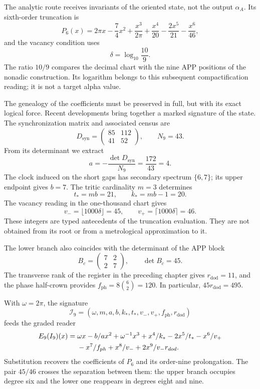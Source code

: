 The analytic route receives invariants of the oriented state, not the output
\(\alpha_A\). Its sixth-order truncation is
\begin{equation}
 P_6(x)=2\pi x-\frac74x^2
 +\frac{x^3}{2\pi}
 +\frac{x^4}{20}-\frac{2x^5}{21}-\frac{x^6}{46},
 \label{x_reciprocidad:eq:alpha-p6}
\end{equation}
and the vacancy condition uses
\[
 \delta=\log_{10}\frac{10}{9}.
\]
The ratio \(10/9\) compares the decimal chart with the nine APP positions
of the nonadic construction. Its logarithm belongs to this subsequent
compactification reading; it is not a target alpha value.

The genealogy of the coefficients must be preserved in full, but with its
exact logical force. Recent developments bring together a marked signature
of the state. The synchronization matrix and associated census are
\[
 D_{\mathrm{syn}}=\begin{pmatrix}85&112\\41&52\end{pmatrix},
 \qquad N_9=43.
\]
From its determinant we extract
\[
 a=-\frac{\det D_{\mathrm{syn}}}{N_9}
   =\frac{172}{43}=4.
\]
The clock induced on the short gaps has secondary spectrum
\(\{6,7\}\); its upper endpoint gives \(b=7\). The tritic
cardinality \(m=3\) determines
\[
 t_*=mb=21,\qquad k_*=mb-1=20.
\]
The vacancy reading in the one-thousand chart gives
\[
 v_-=\lfloor1000\delta\rfloor=45,\qquad
 v_+=\lceil1000\delta\rceil=46.
\]
These integers are typed antecedents of the truncation evaluation. They are not
obtained from its root or from a metrological approximation to it.

The lower branch also coincides with the determinant of the APP block
\[
 B_c=\begin{pmatrix}7&2\\2&7\end{pmatrix},\qquad\det B_c=45.
\]
The transverse rank of the register in the preceding chapter gives
\(r_{\mathrm{dod}}=11\), and the phase half-crown provides
\(f_{\mathrm{ph}}=8\binom62=120\). In particular,
\(45r_{\mathrm{dod}}=495\).

With \(\omega=2\pi\), the signature
\[
 \mathcal I_9=(\omega,m,a,b,k_*,t_*,v_-,v_+,f_{\mathrm{ph}},r_{\mathrm{dod}})
\]
feeds the graded reader
\begin{align}
 \mathfrak E_9(\mathcal I_9)(x)
 ={}&\omega x-\frac ba x^2+\omega^{-1}x^3
 +\frac{x^4}{k_*}-\frac{2x^5}{t_*}-\frac{x^6}{v_+}\notag\\
 &-\frac{x^7}{f_{\mathrm{ph}}}+\frac{x^8}{v_-}
 +\frac{2x^9}{v_-r_{\mathrm{dod}}}.
 \label{x_reciprocidad:eq:alpha-firma-coeficientes}
\end{align}
Substitution recovers the coefficients of \(P_6\) and its
order-nine prolongation. The pair \(45/46\) crosses the separation
between them: the upper branch occupies degree six and the lower one reappears
in degrees eight and nine.

